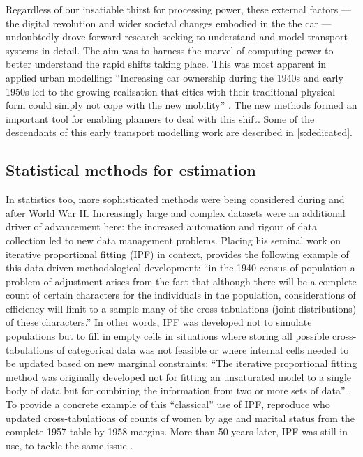 Regardless of our insatiable thirst for processing power, these external factors
--- the digital revolution and wider societal changes embodied in the the
car --- undoubtedly drove forward research seeking to understand and model
transport systems in detail. The aim was to harness the marvel of computing
power to better understand the rapid shifts taking place.
This was most apparent in applied urban modelling: ``Increasing car
ownership during the 1940s and early 1950s led to the growing realisation
that cities with their traditional physical form could simply not cope
with the new mobility'' \citep[p.~6]{batty1976urban}. The new methods formed an
important tool for enabling planners to deal with this shift.
Some of the descendants of this early transport modelling work are described in
\cref{s:dedicated}.

\subsection{Statistical methods for estimation}
In statistics too, more
sophisticated methods were being considered during and after World War II.
Increasingly large and complex
datasets were an additional driver of advancement here: the increased automation
and rigour of data collection led to new data management
problems. Placing his seminal work on iterative proportional fitting (IPF) in
context, \citet[p.~427]{Deming1940} provides the following example of this
data-driven methodological development:
``in the 1940 census of population a problem of adjustment arises from the fact
that although there will be a complete count of certain characters for the
individuals in the population, considerations of efficiency will limit to a
sample many of the cross-tabulations (joint distributions) of these
characters.'' In other words, IPF was developed not to simulate populations but
to fill in empty cells in situations where storing all possible cross-tabulations of
categorical data was not feasible or where internal cells needed to be
updated based on new marginal constraints:
``The iterative proportional fitting method was originally
developed not for fitting
an unsaturated model to a single body of data but for combining the information
from two or more sets of data'' \citep[p.~97]{bishop2007discrete}. To provide a
concrete example of this ``classical'' use of IPF, \citet{bishop2007discrete}
reproduce \citet{Friedlander1961-ipf} who updated cross-tabulations of
counts of women by age and marital status from the complete 1957 table by 1958
margins. More than 50 years later, IPF was still in use, to
tackle the same issue \citep{Jirousek1995}.

